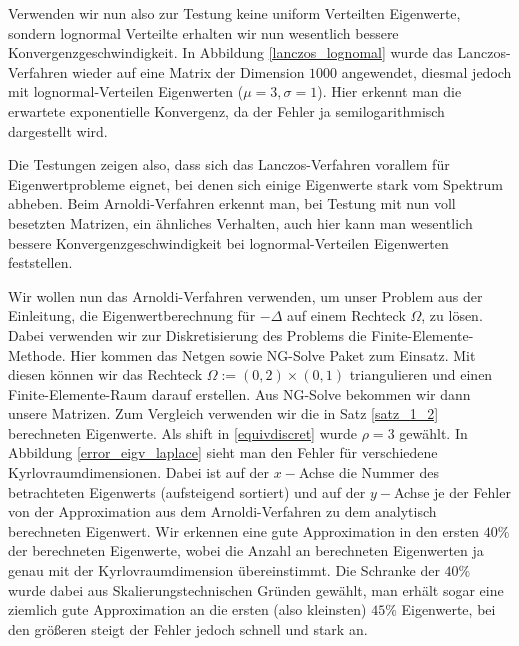 \documentclass{article}
\begin{document}
\begin{theorem}
Verwenden wir nun also zur Testung keine uniform Verteilten Eigenwerte, sondern lognormal Verteilte erhalten wir nun wesentlich bessere Konvergenzgeschwindigkeit. In Abbildung \ref{lanczos_lognomal} wurde das Lanczos-Verfahren wieder auf eine Matrix der Dimension $1000$ angewendet, diesmal jedoch mit lognormal-Verteilen Eigenwerten ($\mu = 3, \sigma = 1$). Hier erkennt man die erwartete exponentielle Konvergenz, da der Fehler ja semilogarithmisch dargestellt wird.



Die Testungen zeigen also, dass sich das Lanczos-Verfahren vorallem für Eigenwertprobleme eignet, bei denen sich einige Eigenwerte stark vom Spektrum abheben. Beim Arnoldi-Verfahren erkennt man, bei Testung mit nun voll besetzten Matrizen, ein ähnliches Verhalten, auch hier kann man wesentlich bessere Konvergenzgeschwindigkeit bei lognormal-Verteilen Eigenwerten feststellen.

Wir wollen nun das Arnoldi-Verfahren verwenden, um unser Problem aus der Einleitung, die Eigenwertberechnung für $-\Delta$ auf einem Rechteck $\Omega$, zu lösen. Dabei verwenden wir zur Diskretisierung des Problems die Finite-Elemente-Methode. Hier kommen das Netgen sowie NG-Solve Paket zum Einsatz. Mit diesen können wir das Rechteck $\Omega := (0,2) \times (0,1)$ triangulieren und einen Finite-Elemente-Raum darauf erstellen. Aus NG-Solve bekommen wir dann unsere Matrizen. Zum Vergleich verwenden wir die in Satz \ref{satz_1_2} berechneten Eigenwerte. Als shift in \ref{equivdiscret} wurde $\rho = 3$ gewählt. In Abbildung \ref{error_eigv_laplace} sieht man den Fehler für verschiedene Kyrlovraumdimensionen. Dabei ist auf der $x-$Achse die Nummer des betrachteten Eigenwerts (aufsteigend sortiert) und auf der $y-$Achse je der Fehler von der Approximation aus dem Arnoldi-Verfahren zu dem analytisch berechneten Eigenwert. Wir erkennen eine gute Approximation in den ersten $40\%$ der berechneten Eigenwerte, wobei die Anzahl an berechneten Eigenwerten ja genau mit der Kyrlovraumdimension übereinstimmt. Die Schranke der $40\%$ wurde dabei aus Skalierungstechnischen Gründen gewählt, man erhält sogar eine ziemlich gute Approximation an die ersten (also kleinsten) $45\%$ Eigenwerte, bei den größeren steigt der Fehler jedoch schnell und stark an.


\end{theorem}
\end{document}
